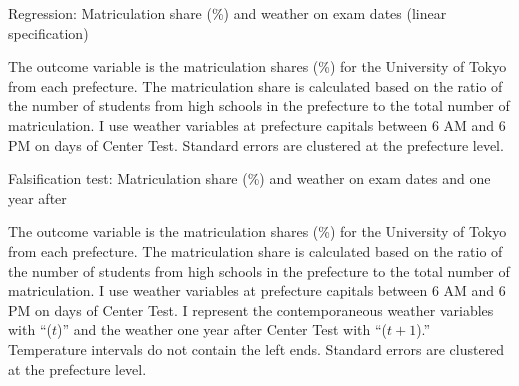 \documentclass[12pt,letterpaper]{article}
\begin{document}
%  

\begin{table}[H]
  \center
  \caption{Regression: Matriculation share (\%) and weather on exam dates (linear specification)}
  \small
  
  \label{tab:linear_reg}
  \small
  \begin{tablenotes}
    \item
      The outcome variable is the matriculation shares (\%) for the University of Tokyo from each prefecture.
      The matriculation share is calculated based on the ratio of the number of students from high schools in the prefecture to the total number of matriculation.
      I use weather variables at prefecture capitals between 6 AM and 6 PM on days of Center Test.
      Standard errors are clustered at the prefecture level.
  \end{tablenotes}
\end{table}

\begin{table}[H]
  \center
  \caption{Falsification test: Matriculation share (\%) and weather on exam dates and one year after}
  \scriptsize
  
  \label{tab:reg_placebo_exam}
  \scriptsize
  \begin{tablenotes}
    \item
      The outcome variable is the matriculation shares (\%) for the University of Tokyo from each prefecture.
      The matriculation share is calculated based on the ratio of the number of students from high schools in the prefecture to the total number of matriculation.
      I use weather variables at prefecture capitals between 6 AM and 6 PM on days of Center Test.
      I represent the contemporaneous weather variables with ``($t$)'' and the weather one year after Center Test with ``($t + 1$).''
      Temperature intervals do not contain the left ends.
      Standard errors are clustered at the prefecture level.
  \end{tablenotes}
\end{table}
\end{document}
